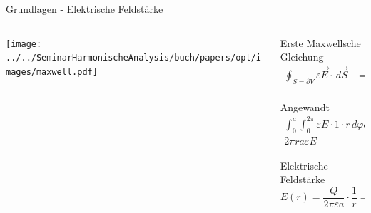 \begin{frame}{Grundlagen - Elektrische Feldstärke}
    \begin{columns}
        \begin{column}{0.5\textwidth}
            \begin{center}
                \texttt{[image: ../../SeminarHarmonischeAnalysis/buch/papers/opt/images/maxwell.pdf]}
            \end{center}
        \end{column}

        \begin{column}{0.5\textwidth}
            \begin{block}{Erste Maxwellsche Gleichung}
                \begin{align*}
                    \oint_{S=\partial V} \varepsilon\vec{E} \cdot\, d\vec{S}
                    &=
                    \int_{V}\rho\, dV
                    \\
                \end{align*}
            \end{block}
            \pause
            \begin{block}{Angewandt}
                \begin{align*}
                    \int_{0}^{a}\int_{0}^{2\pi} \varepsilon E\cdot 1 \cdot r\, d\varphi dl
                    &=
                    Q
                    \\
                    2\pi ra\varepsilon E
                    &=
                    Q
                \end{align*}
            \end{block}
            \pause
            \begin{exampleblock}{Elektrische Feldstärke}
                \begin{equation*}
                    E(r)
                    =
                    \frac{Q}{2\pi\varepsilon a} \cdot \frac{1}{r}
                    =
                    C \cdot \frac{1}{r}
                \end{equation*}
            \end{exampleblock}
        \end{column}
    \end{columns}
\end{frame}
